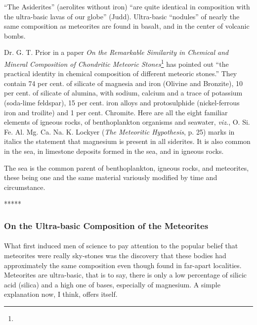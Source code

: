 \documentclass[a4paper, 12pt, oneside]{article}
\begin{document}
``The Asiderites'' (aerolites without iron) ``are quite identical in composition with the ultra-basic lavas of our globe'' (Judd). Ultra-basic ``nodules'' of nearly the same composition as meteorites are found in basalt, and in the center of volcanic bombs.

Dr. G. T. Prior in a paper \emph{On the Remarkable Similarity in Chemical and Mineral Composition of Chondritic Meteoric Stones}\footnote{} has pointed out ``the practical identity in chemical composition of different meteoric stones.'' They contain 74 per cent. of silicate of magnesia and iron (Olivine and Bronzite), 10 per cent. of silicate of alumina, with sodium, calcium and a trace of potassium (soda-lime feldspar), 15 per cent. iron alloys and protosulphide (nickel-ferrous iron and troilite) and 1 per cent. Chromite. Here are all the eight familiar elements of igneous rocks, of benthoplankton organisms and seawater, \emph{viz.}, O. Si. Fe. Al. Mg. Ca. Na. K. Lockyer (\emph{The Meteoritic Hypothesis}, p. 25) marks in italics the statement that magnesium is present in all siderites. It is also common in the sea, in limestone deposits formed in the sea, and in igneous rocks.

The sea is the common parent of benthoplankton, igneous rocks, and meteorites, these being one and the same material variously modified by time and circumstance.

\centerline{*\hspace{15mm}*\hspace{15mm}*\hspace{15mm}*\hspace{15mm}*}
\bigskip

\subsubsection{On the Ultra-basic Composition of the Meteorites}
\paragraph{}
What first induced men of science to pay attention to the popular belief that meteorites were really sky-stones was the discovery that these bodies had approximately the same composition even though found in far-apart localities. Meteorites are ultra-basic, that is to say, there is only a low percentage of silicic acid (silica) and a high one of bases, especially of magnesium. A simple explanation now, I think, offers itself.
\end{document}

